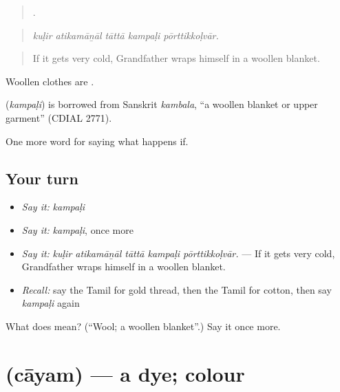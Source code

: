 \begin{quote}
    .
\end{quote}

\begin{quote}
\emph{kuḷir atikamāṉāl tāttā kampaḷi pōrttikkoḷvār.}
\end{quote}

\begin{quote}
If it gets very cold, Grandfather wraps himself in a woollen blanket.
\end{quote}

Woollen clothes are  .

\begin{cousinweb}
\textbf{} (\emph{kampaḷi}) is borrowed from Sanskrit \emph{kambala}, \textquotedblleft{}a woollen blanket or upper garment\textquotedblright{} (CDIAL 2771).
\end{cousinweb}

\begin{grammarlens}[title={What you've built}]
One more word for saying what happens if.
\end{grammarlens}

\subsection*{Your turn}
\begin{itemize}
\raggedright
  \item \emph{Say it:} \emph{kampaḷi}
  \item \emph{Say it:} \emph{kampaḷi}, once more
  \item \emph{Say it:} \emph{kuḷir atikamāṉāl tāttā kampaḷi pōrttikkoḷvār.} — If it gets very cold, Grandfather wraps himself in a woollen blanket.
  \item \emph{Recall:} say the Tamil for gold thread, then the Tamil for cotton, then say \emph{kampaḷi} again
\end{itemize}

\begin{tcolorbox}[breakable,colback=teal!4,colframe=teal!35!black,title={Before you move on}]
What does  mean? (\textquotedblleft{}Wool; a woollen blanket\textquotedblright{}.) Say it once more.
\end{tcolorbox}
\section[\texorpdfstring{\ta{சாயம்} (cāyam)}{சாயம் (cāyam)}]{ (cāyam) — a dye; colour}


